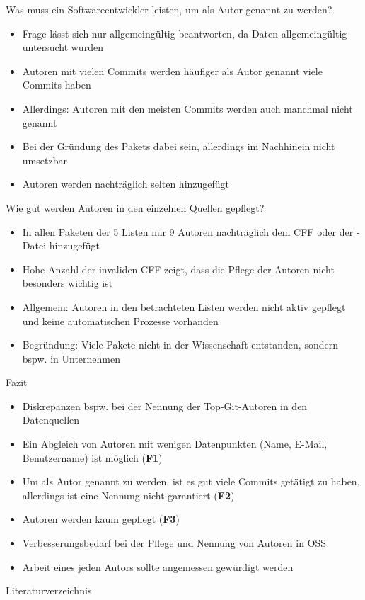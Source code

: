 \documentclass[%
    handout,
    aspectratio=1610,
    10pt,
    onlytextwidth, %
]{beamer}
\begin{document}
\begin{frame}{Was muss ein Softwareentwickler leisten, um als Autor genannt zu werden?}
    \begin{itemize}
        \item Frage lässt sich nur allgemeingültig beantworten, da Daten allgemeingültig untersucht wurden
        \item Autoren mit vielen Commits werden häufiger als Autor genannt \rightarrow{} viele Commits haben
        \item Allerdings: Autoren mit den meisten Commits werden auch manchmal nicht genannt
        \item Bei der Gründung des Pakets dabei sein, allerdings im Nachhinein nicht umsetzbar
        \item Autoren werden nachträglich selten hinzugefügt %
    \end{itemize}
\end{frame}

\begin{frame}{Wie gut werden Autoren in den einzelnen Quellen gepflegt?}
    \begin{itemize}
        \item In allen Paketen der 5 Listen nur 9 Autoren nachträglich dem CFF oder der -Datei hinzugefügt
        \item Hohe Anzahl der invaliden CFF zeigt, dass die Pflege der Autoren nicht besonders wichtig ist
        \item Allgemein: Autoren in den betrachteten Listen werden nicht aktiv gepflegt und keine automatischen Prozesse vorhanden
        \item Begründung: Viele Pakete nicht in der Wissenschaft entstanden, sondern bspw. in Unternehmen %
    \end{itemize}
\end{frame}

\begin{frame}{Fazit}
    \begin{itemize}
        \item Diskrepanzen bspw. bei der Nennung der Top-Git-Autoren in den Datenquellen
        \item Ein Abgleich von Autoren mit wenigen Datenpunkten (Name, E-Mail, Benutzername) ist möglich (\textcolor{links}{\textbf{F1}})
        \item Um als Autor genannt zu werden, ist es gut viele Commits getätigt zu haben, allerdings ist eine Nennung nicht garantiert (\textcolor{links}{\textbf{F2}})
        \item Autoren werden kaum gepflegt (\textcolor{links}{\textbf{F3}})
        \item Verbesserungsbedarf bei der Pflege und Nennung von Autoren in OSS
        \item Arbeit eines jeden Autors sollte angemessen gewürdigt werden %
    \end{itemize}
\end{frame}

\begin{frame}{Literaturverzeichnis}
    \printbibliography
\end{frame}
\end{document}
